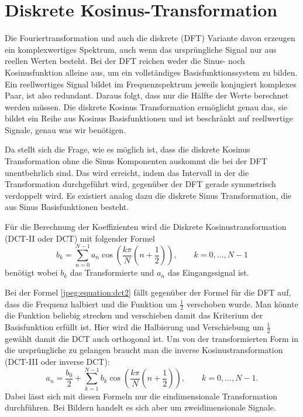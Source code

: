 %
%
%
%
\section{Diskrete Kosinus-Transformation
\label{jpeg:section:dct}}
Die Fouriertransformation und auch die diskrete (DFT) Variante davon erzeugen ein komplexwertiges Spektrum, auch wenn das ursprüngliche Signal nur aus reellen Werten besteht.
Bei der DFT reichen weder die Sinus- noch Kosinusfunktion alleine aus, um ein vollständiges Basisfunktionssystem zu bilden.
Ein reellwertiges Signal bildet im Frequenzspektrum jeweils konjugiert komplexes Paar, ist also redundant.
Daraus folgt, dass nur die Hälfte der Werte berechnet werden müssen.
Die diskrete Kosinus Transformation ermöglicht genau das, sie bildet ein Reihe aus Kosinus Basisfunktionen und ist beschränkt auf reellwertige Signale, genau was wir benötigen.

Da stellt sich die Frage, wie es möglich ist, dass die diskrete Kosinus Transformation ohne die Sinus Komponenten auskommt die bei der DFT unentbehrlich sind.
Das wird erreicht, indem das Intervall in der die Transformation durchgeführt wird, gegenüber der DFT gerade symmetrisch verdoppelt wird.
Es existiert analog dazu die diskrete Sinus Transformation, die aus Sinus Basisfunktionen besteht.

Für die Berechnung der Koeffizienten wird die Diskrete Kosinustransformation (DCT-II oder DCT) mit folgender Formel  
\begin{equation}
    b_k
    =
    \sum \limits_{n=0}^{N-1} a_n 
    \cos\left(
        \frac{k\pi}{N}\left(n + \frac{1}{2} \right) 
    \right),
    \qquad k = 0,\dots,N-1
\label{jpeg:equation:dct2}
\end{equation}
benötigt wobei \(b_k\) das Transformierte und \(a_n\) das Eingangssignal ist.

Bei der Formel \eqref{jpeg:equation:dct2} fällt gegenüber der Formel für die DFT auf, dass die Frequenz halbiert und die Funktion um \(\frac{1}{2}\) verschoben wurde.
Man könnte die Funktion beliebig strecken und verschieben damit das Kriterium der Basisfunktion erfüllt ist.
Hier wird die Halbierung und Verschiebung um \(\frac{1}{2}\) gewählt damit die DCT auch orthogonal ist.
Um von der transformierten Form in die ursprüngliche zu gelangen braucht man die inverse Kosinustransformation (DCT-III oder inverse DCT):
\begin{equation}
    a_n
    =
    \frac{b_0}{2} +
    \sum \limits_{k=1}^{N-1} b_k 
    \cos\left(
    \frac{k\pi}{N}\left(n + \frac{1}{2} \right) 
    \right),
    \qquad k = 0,\dots,N-1.
    \label{jpeg:equation:dct3}
\end{equation}
Dabei lässt sich mit diesen Formeln nur die eindimensionale Transformation durchführen.
Bei Bildern handelt es sich aber um zweidimensionale Signale.

